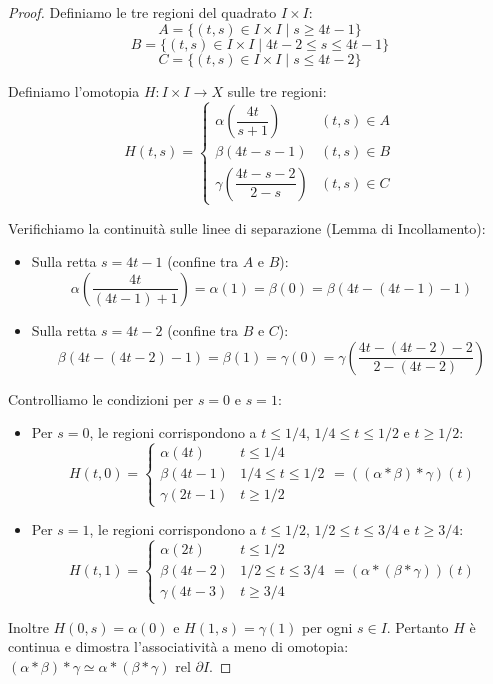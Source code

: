 \begin{proof}
Definiamo le tre regioni del quadrato $I \times I$:
\[
A = \{ (t,s) \in I \times I \mid s \geqslant 4t-1 \}
\]
\[
B = \{ (t,s) \in I \times I \mid 4t-2 \leqslant s \leqslant 4t-1 \}
\]
\[
C = \{ (t,s) \in I \times I \mid s \leqslant 4t-2 \}
\]

Definiamo l'omotopia $H: I \times I \to X$ sulle tre regioni:
\[
H(t,s) = 
\begin{cases}
    \alpha\left( \dfrac{4t}{s+1} \right) & (t,s) \in A \\[1em]
    \beta(4t - s - 1) & (t,s) \in B \\[1em]
    \gamma\left( \dfrac{4t - s - 2}{2 - s} \right) & (t,s) \in C
\end{cases}
\]

Verifichiamo la continuità sulle linee di separazione (Lemma di Incollamento):
\begin{itemize}
    \item Sulla retta $s = 4t-1$ (confine tra $A$ e $B$):
    \[
    \alpha\left(\frac{4t}{(4t-1)+1}\right) = \alpha(1) = \beta(0) = \beta(4t - (4t-1) - 1)
    \]
    \item Sulla retta $s = 4t-2$ (confine tra $B$ e $C$):
    \[
    \beta(4t - (4t-2) - 1) = \beta(1) = \gamma(0) = \gamma\left(\frac{4t - (4t-2) - 2}{2 - (4t-2)}\right)
    \]
\end{itemize}

Controlliamo le condizioni per $s = 0$ e $s = 1$:
\begin{itemize}
    \item Per $s = 0$, le regioni corrispondono a $t \leqslant 1/4$, $1/4 \leqslant t \leqslant 1/2$ e $t \geqslant 1/2$:
    \[
    H(t,0) = 
    \begin{cases}
        \alpha(4t) & t \leqslant 1/4 \\
        \beta(4t-1) & 1/4 \leqslant t \leqslant 1/2 \\
        \gamma(2t-1) & t \geqslant 1/2
    \end{cases}
    = ((\alpha * \beta) * \gamma)(t)
    \]
    \item Per $s = 1$, le regioni corrispondono a $t \leqslant 1/2$, $1/2 \leqslant t \leqslant 3/4$ e $t \geqslant 3/4$:
    \[
    H(t,1) = 
    \begin{cases}
        \alpha(2t) & t \leqslant 1/2 \\
        \beta(4t-2) & 1/2 \leqslant t \leqslant 3/4 \\
        \gamma(4t-3) & t \geqslant 3/4
    \end{cases}
    = (\alpha * (\beta * \gamma))(t)
    \]
\end{itemize}
Inoltre $H(0,s) = \alpha(0)$ e $H(1,s) = \gamma(1)$ per ogni $s \in I$.
Pertanto $H$ è continua e dimostra l'associatività a meno di omotopia: $(\alpha * \beta) * \gamma \simeq \alpha * (\beta * \gamma) \text{ rel } \partial I$.
\end{proof}

